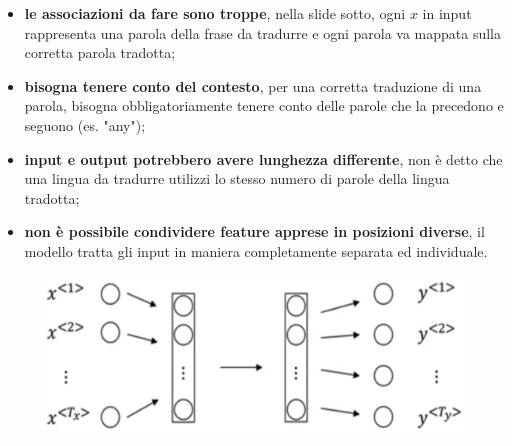 \begin{itemize}
   \item \textbf{le associazioni da fare sono troppe}, nella slide sotto, ogni $x$ in input rappresenta una
   parola della frase da tradurre e ogni parola va mappata sulla corretta parola tradotta;
   \item \textbf{bisogna tenere conto del contesto}, per una corretta traduzione di una parola,
   bisogna obbligatoriamente tenere conto delle parole che la precedono e seguono (es. "any");
   \item \textbf{input e output potrebbero avere lunghezza differente}, non è detto che una lingua da 
   tradurre utilizzi lo stesso numero di parole della lingua tradotta;
   \item  \textbf{non è possibile condividere feature apprese in posizioni diverse}, il modello tratta gli 
   input in maniera completamente separata ed individuale.
\end{itemize}
\begin{figure}[!h]
   \includegraphics[scale=.5]{images/rnn/mlp.png}
   \centering
\end{figure}
\newpage

